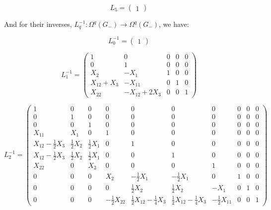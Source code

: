 \documentclass[reqno,12pt]{amsart}
\theoremstyle{plain}
\theoremstyle{definition}
\begin{document}
$$
L_5=\left(\begin{array}{c}
1
\end{array}\right)
$$


And for their inverses, $L_q^{-1}\colon\Omega^q(G_-)\to\Omega^q(G_-)$, we have:

$$
L^{-1}_0=\left(\begin{array}{c}
1
\end{array}\right)
$$

$$
L^{-1}_1=\left(\begin{array}{cc|c|cc}
1&       0&          0&0&0\\
0&       1&          0&0&0\\\hline
X_2&      -X_1&        1&0&0\\\hline
X_{12}+X_3&-X_{11}&      0&1&0\\
X_{22}&    -X_{12}+2X_3&0&0&1
\end{array}\right)
$$

$$
L^{-1}_2=\left(\begin{array}{c|cc|cccc|cc|c}
1&     0&     0&     0&      0&      0&      0&      0&0&0\\\hline
0&     1&     0&     0&      0&      0&      0&      0&0&0\\
0&     0&     1&     0&      0&      0&      0&      0&0&0\\\hline
X_{11}&  X_1&    0&     1&      0&      0&      0&      0&0&0\\
X_{12}-\tfrac12X_3&\tfrac12X_2&\tfrac12X_1&0&      1&      0&      0&      0&0&0\\
X_{12}-\tfrac12X_3&\tfrac12X_2&\tfrac12X_1&0&      0&      1&      0&      0&0&0\\
X_{22}&  0&     X_2&    0&      0&      0&      1&      0&0&0\\\hline
0&     0&     0&     X_2&     -\tfrac12X_1&-\tfrac12X_1&0&      1&0&0\\
0&     0&     0&     0&      \tfrac12X_2& \tfrac12X_2& -X_1&    0&1&0\\\hline
0&     0&     0&-\tfrac12X_{22}&\tfrac12X_{12}-\tfrac14X_3&\tfrac12X_{12}-\tfrac14X_3&-\tfrac12X_{11}&0&0&1
\end{array}\right)
$$
\end{document}
